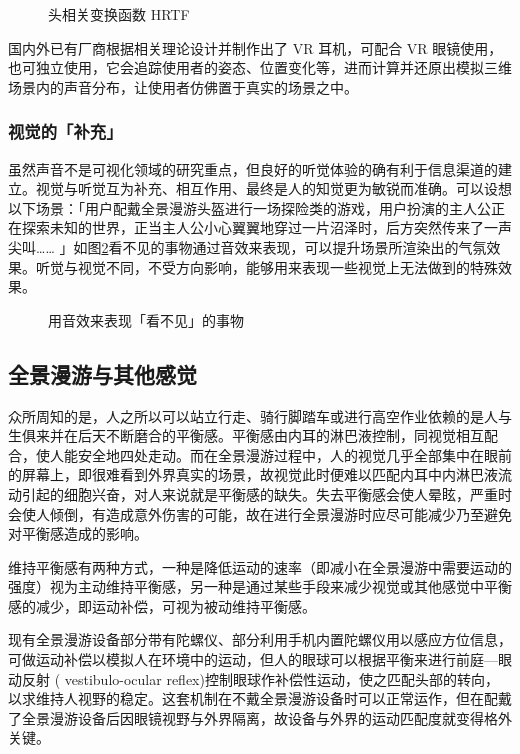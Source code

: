 \begin{figure}[htp]
\centering
{}
\caption{头相关变换函数 HRTF}
\label{fig:hrtf}
\end{figure}

国内外已有厂商根据相关理论设计并制作出了 VR 耳机，可配合 VR 眼镜使用，也可独立使用，它会追踪使用者的姿态、位置变化等，进而计算并还原出模拟三维场景内的声音分布，让使用者仿佛置于真实的场景之中。

\subsubsection{视觉的「补充」}
虽然声音不是可视化领域的研究重点，但良好的听觉体验的确有利于信息渠道的建立。视觉与听觉互为补充、相互作用、最终是人的知觉更为敏锐而准确。可以设想以下场景：「用户配戴全景漫游头盔进行一场探险类的游戏，用户扮演的主人公正在探索未知的世界，正当主人公小心翼翼地穿过一片沼泽时，后方突然传来了一声尖叫…… 」如图\ref{fig:audio-source}看不见的事物通过音效来表现，可以提升场景所渲染出的气氛效果。听觉与视觉不同，不受方向影响，能够用来表现一些视觉上无法做到的特殊效果。

\begin{figure}[htp]
\centering
{}
\caption{用音效来表现「看不见」的事物}
\label{fig:audio-source}
\end{figure}

\subsection{全景漫游与其他感觉}
众所周知的是，人之所以可以站立行走、骑行脚踏车或进行高空作业依赖的是人与生俱来并在后天不断磨合的平衡感。平衡感由内耳的淋巴液控制，同视觉相互配合，使人能安全地四处走动。而在全景漫游过程中，人的视觉几乎全部集中在眼前的屏幕上，即很难看到外界真实的场景，故视觉此时便难以匹配内耳中内淋巴液流动引起的细胞兴奋，对人来说就是平衡感的缺失。失去平衡感会使人晕眩，严重时会使人倾倒，有造成意外伤害的可能，故在进行全景漫游时应尽可能减少乃至避免对平衡感造成的影响。

维持平衡感有两种方式，一种是降低运动的速率（即减小在全景漫游中需要运动的强度）视为主动维持平衡感，另一种是通过某些手段来减少视觉或其他感觉中平衡感的减少，即运动补偿，可视为被动维持平衡感。

现有全景漫游设备部分带有陀螺仪、部分利用手机内置陀螺仪用以感应方位信息，可做运动补偿以模拟人在环境中的运动，但人的眼球可以根据平衡来进行前庭—眼动反射 ( vestibulo-ocular reflex)控制眼球作补偿性运动，使之匹配头部的转向，以求维持人视野的稳定。这套机制在不戴全景漫游设备时可以正常运作，但在配戴了全景漫游设备后因眼镜视野与外界隔离，故设备与外界的运动匹配度就变得格外关键。

